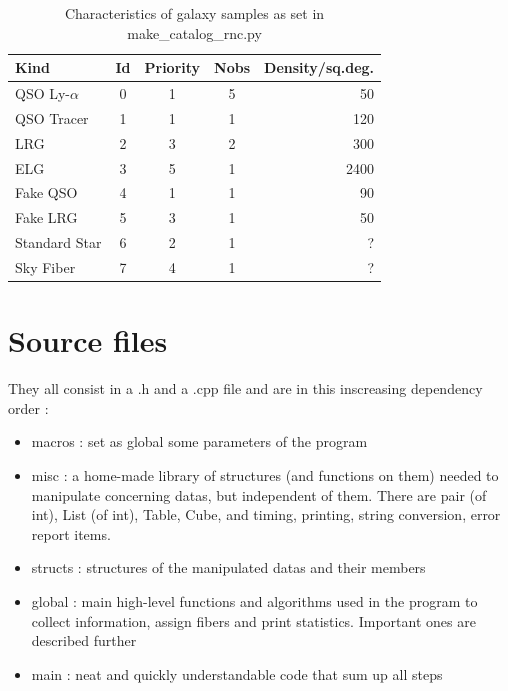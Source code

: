 \documentclass{extarticle}
\begin{document}
\begin{multicols}{2}
\begin{table}[H]\centering
	\begin{tabular}{lcccr} \hline
		Kind&Id&Priority&Nobs&Density/sq.deg.\\ \hline
		QSO Ly-$\alpha$& 0 & 1 & 5 &  50\\
		QSO Tracer & 1 & 1 & 1& 120\\
		LRG & 2 & 3 &2 & 300\\
		ELG & 3 & 5 & 1 & 2400\\
		Fake QSO & 4 & 1 & 1& 90\\
		Fake LRG & 5 & 3 & 1 & 50\\
		Standard Star & 6 & 2 & 1&  ?\\
		Sky Fiber & 7 & 4 & 1& ?\\ \hline
	\end{tabular}
	\caption{Characteristics of galaxy samples as set in make\_catalog\_rnc.py}\label{table:characteristics}
\end{table}


\section{Source files}
They all consist in a .h and a .cpp file and are in this inscreasing dependency order :
\begin{itemize} 
	\item macros : set as global some parameters of the program
	\item misc : a home-made library of structures (and functions on them) needed to manipulate concerning datas, but independent of them. There are pair (of int), List (of int), Table, Cube, and timing, printing, string conversion, error report items.
	\item structs : structures of the manipulated datas and their members
	\item global : main high-level functions and algorithms used in the program to collect information, assign fibers and print statistics. Important ones are described further
	\item main : neat and quickly understandable code that sum up all steps
\end{itemize} 


\end{multicols}
\end{document}
